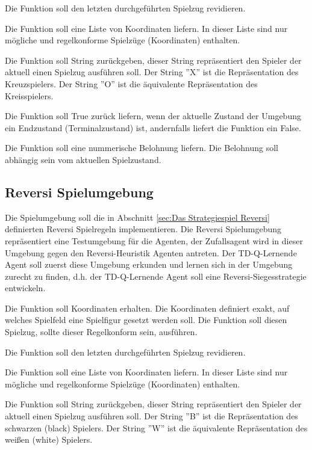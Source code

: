 Die Funktion soll den letzten durchgeführten Spielzug revidieren.

Die Funktion soll eine Liste von Koordinaten liefern. In dieser Liste sind nur mögliche und regelkonforme Spielzüge (Koordinaten) enthalten.

Die Funktion soll String zurückgeben, dieser String repräsentiert den Spieler der aktuell einen Spielzug ausführen soll. Der String ''X'' ist die Repräsentation des Kreuzspielers. Der String ''O'' ist die äquivalente Repräsentation des Kreisspielers.

Die Funktion soll True zurück liefern, wenn der aktuelle Zustand der Umgebung ein Endzustand (Terminalzustand) ist, andernfalls liefert die Funktion ein False.

Die Funktion soll eine nummerische Belohnung liefern. Die Belohnung soll abhängig sein vom aktuellen Spielzustand.

\subsection{Reversi Spielumgebung}
Die Spielumgebung soll die in Abschnitt \ref{sec:Das Strategiespiel Reversi} definierten Reversi Spielregeln implementieren. Die Reversi Spielumgebung repräsentiert eine Testumgebung für die Agenten, der Zufallsagent wird in dieser Umgebung gegen den Reversi-Heuristik Agenten antreten. Der TD-Q-Lernende Agent soll zuerst diese Umgebung erkunden und lernen sich in der Umgebung zurecht zu finden, d.h. der TD-Q-Lernende Agent soll eine Reversi-Siegesstrategie entwickeln. 

Die Funktion soll Koordinaten erhalten. Die Koordinaten definiert exakt, auf welches Spielfeld eine Spielfigur gesetzt werden soll. Die Funktion soll diesen Spielzug, sollte dieser Regelkonform sein, ausführen.

Die Funktion soll den letzten durchgeführten Spielzug revidieren.

Die Funktion soll eine Liste von Koordinaten liefern. In dieser Liste sind nur mögliche und regelkonforme Spielzüge (Koordinaten) enthalten.

Die Funktion soll String zurückgeben, dieser String repräsentiert den Spieler der aktuell einen Spielzug ausführen soll. Der String ''B'' ist die Repräsentation des schwarzen (black) Spielers. Der String ''W'' ist die äquivalente Repräsentation des weißen (white) Spielers.

